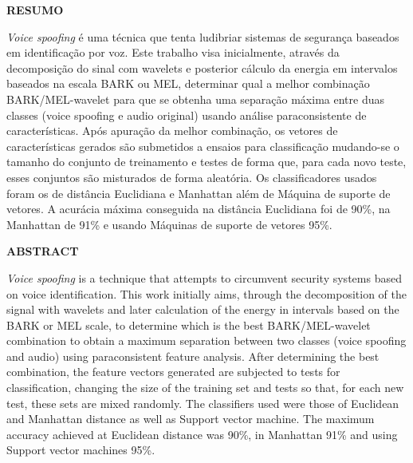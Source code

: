 \setlength{\parindent}{0pt}
\newpage \thispagestyle{empty}
\vspace{1.5cm}
\fontsize{12}{\baselineskip} \selectfont

\begin{center}
	{\huge{\textbf{RESUMO}}}
\end{center}

\begin{myenv}{1.5}
	\fontsize{12}{\baselineskip} \selectfont \onehalfspacing
	\par \null
	\par \null
	\par \textit{Voice spoofing} é uma técnica que tenta ludibriar sistemas de segurança baseados em identificação por voz. Este trabalho visa inicialmente, através da decomposição do sinal com wavelets e posterior cálculo da energia em intervalos baseados na escala BARK ou MEL, determinar qual a melhor combinação BARK/MEL-wavelet para que se obtenha uma separação máxima entre duas classes (voice spoofing e audio original) usando análise paraconsistente de características. Após apuração da melhor combinação, os vetores de características gerados são submetidos a ensaios para classificação mudando-se o tamanho do conjunto de treinamento e testes de forma que, para cada novo teste, esses conjuntos são misturados de forma aleatória. Os classificadores usados foram os de distância Euclidiana e Manhattan além de Máquina de suporte de vetores. A acurácia máxima conseguida na distância Euclidiana foi de 90\%, na Manhattan de 91\% e usando Máquinas de suporte de vetores 95\%.
\end{myenv}

\setlength{\parindent}{0pt}
\newpage \thispagestyle{empty}
\vspace{1.5cm}
\fontsize{12}{\baselineskip} \selectfont
\begin{center}
	{\huge{\textbf{ABSTRACT}}}
\end{center}

\begin{myenv}{1.5}
	\fontsize{12}{\baselineskip} \selectfont \onehalfspacing
	\par \null
	\par \null
	\par \textit{Voice spoofing} is a technique that attempts to circumvent security systems based on voice identification. This work initially aims, through the decomposition of the signal with wavelets and later calculation of the energy in intervals based on the BARK or MEL scale, to determine which is the best BARK/MEL-wavelet combination to obtain a maximum separation between two classes (voice spoofing and audio) using paraconsistent feature analysis. After determining the best combination, the feature vectors generated are subjected to tests for classification, changing the size of the training set and tests so that, for each new test, these sets are mixed randomly. The classifiers used were those of Euclidean and Manhattan distance as well as Support vector machine. The maximum accuracy achieved at Euclidean distance was 90\%, in Manhattan 91\% and using Support vector machines 95\%.
\end{myenv}